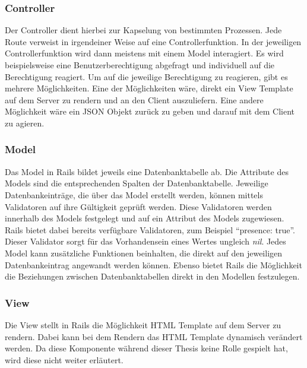 \begin{minipage}{\linewidth}
	
\end{minipage}

\begin{minipage}{\linewidth}
	
\end{minipage}


\subsubsection{Controller}
\label{sec: rails_controller}
Der Controller dient hierbei zur Kapselung von bestimmten Prozessen. Jede Route verweist in irgendeiner Weise auf eine Controllerfunktion. In der jeweiligen Controllerfunktion wird dann meistens mit einem Model interagiert. Es wird beispielsweise eine Benutzerberechtigung abgefragt und individuell auf die Berechtigung reagiert. Um auf die jeweilige Berechtigung zu reagieren, gibt es mehrere Möglichkeiten. Eine der Möglichkeiten wäre, direkt ein View Template auf dem Server zu rendern und an den Client auszuliefern. Eine andere Möglichkeit wäre ein \gls{JSON} Objekt zurück zu geben und darauf mit dem Client zu agieren.

\subsubsection{Model}
\label{sec: rails_model}
Das Model in Rails bildet jeweils eine Datenbanktabelle ab. Die Attribute des Models sind die entsprechenden Spalten der Datenbanktabelle. Jeweilige Datenbankeinträge, die über das Model erstellt werden, können mittels Validatoren auf ihre Gültigkeit geprüft werden. Diese Validatoren werden innerhalb des Models festgelegt und auf ein Attribut des Models zugewiesen. Rails bietet dabei bereits verfügbare Validatoren, zum Beispiel \enquote{presence: true}. Dieser Validator sorgt für das Vorhandensein eines Wertes ungleich \textit{nil}. Jedes Model kann zusätzliche Funktionen beinhalten, die direkt auf den jeweiligen Datenbankeintrag angewandt werden können. Ebenso bietet Rails die Möglichkeit die Beziehungen zwischen Datenbanktabellen direkt in den Modellen festzulegen.

\subsubsection{View}
\label{sec: rails_view}
Die View stellt in Rails die Möglichkeit \gls{HTML} Template auf dem Server zu rendern. Dabei kann bei dem Rendern das \gls{HTML} Template dynamisch verändert werden. Da diese Komponente während dieser Thesis keine Rolle gespielt hat, wird diese nicht weiter erläutert.

